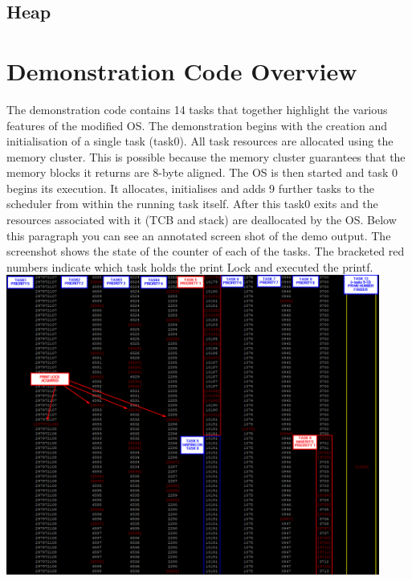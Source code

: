 \documentclass[12pt,a4paper]{article}
\begin{document}
\subsection{Heap}

\pagebreak
\section{Demonstration Code Overview}
The demonstration code contains 14 tasks that together highlight the various features of the modified OS. The demonstration begins with the creation and initialisation of a single task (task0). All task resources are allocated using the memory cluster. This is possible because the memory cluster guarantees that the memory blocks it returns are 8-byte aligned. The OS is then started and task 0 begins its execution. It allocates, initialises and adds 9 further tasks to the scheduler from within the running task itself. After this task0 exits and the resources associated with it (TCB and stack) are deallocated by the OS. Below this paragraph you can see an annotated screen shot of the demo output. The screenshot shows the state of the counter of each of the tasks. The bracketed red numbers indicate which task holds the print Lock and executed the printf.\\

\includegraphics[width=0.92\textwidth]{images/priorityInheritance.png}\\
\end{document}
